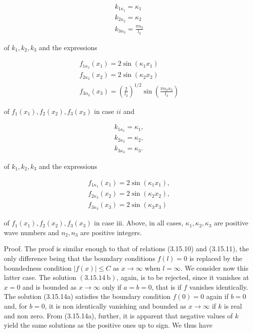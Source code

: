\documentclass{article}
\begin{document}
\begin{align*}
& k_{1 \kappa_{1}}=\kappa_{1}  \tag{3.15.48a}\\
& k_{2 \kappa_{2}}=\kappa_{2}  \tag{3.15.48b}\\
& k_{3 n_{3}}=\frac{\pi n_{3}}{l_{3}} \tag{3.15.48c}
\end{align*}
 
of $k_{1}, k_{2}, k_{3}$ and the expressions
 
\begin{align*}
& f_{1 \kappa_{1}}\left(x_{1}\right)=2 \sin \left(\kappa_{1} x_{1}\right)  \tag{3.15.49a}\\
& f_{2 \kappa_{2}}\left(x_{2}\right)=2 \sin \left(\kappa_{2} x_{2}\right)  \tag{3.15.49b}\\
& f_{3 n_{3}}\left(x_{3}\right)=\left(\frac{2}{l_{3}}\right)^{1 / 2} \sin \left(\frac{\pi n_{3} x_{3}}{l_{3}}\right) \tag{3.15.49c}
\end{align*}
 
of $f_{1}\left(x_{1}\right), f_{2}\left(x_{2}\right), f_{3}\left(x_{3}\right)$ in case $i i$ and
 
\begin{align*}
& k_{1 \kappa_{1}}=\kappa_{1},  \tag{3.15.50a}\\
& k_{2 \kappa_{2}}=\kappa_{2},  \tag{3.15.50b}\\
& k_{3 \kappa_{3}}=\kappa_{3} . \tag{3.15.50c}
\end{align*}
 
of $k_{1}, k_{2}, k_{3}$ and the expressions
 
\begin{align*}
& f_{1 \kappa_{1}}\left(x_{1}\right)=2 \sin \left(\kappa_{1} x_{1}\right),  \tag{3.15.51a}\\
& f_{2 \kappa_{2}}\left(x_{2}\right)=2 \sin \left(\kappa_{2} x_{2}\right),  \tag{3.15.51b}\\
& f_{3 \kappa_{3}}\left(x_{3}\right)=2 \sin \left(\kappa_{3} x_{3}\right) \tag{3.15.51c}
\end{align*}
 
of $f_{1}\left(x_{1}\right), f_{2}\left(x_{2}\right), f_{3}\left(x_{3}\right)$ in case iii. Above, in all cases, $\kappa_{1}, \kappa_{2}, \kappa_{3}$ are positive wave numbers and $n_{2}, n_{3}$ are positive integers.

Proof. The proof is similar enough to that of relations (3.15.10) and (3.15.11), the only difference being that the boundary conditions $f(l)=0$ is replaced by the
boundedness condition $|f(x)| \leq C$ as $x \rightarrow \infty$ when $l=\infty$. We consider now this latter case. The solution $(3.15 .14 \mathrm{~b})$, again, is to be rejected, since it vanishes at $x=0$ and is bounded as $x \rightarrow \infty$ only if $a=b=0$, that is if $f$ vanishes identically. The solution (3.15.14a) satisfies the boundary condition $f(0)=0$ again if $b=0$ and, for $b=0$, it is non identically vanishing and bounded as $x \rightarrow \infty$ if $k$ is real and non zero. From (3.15.14a), further, it is apparent that negative values of $k$ yield the same solutions as the positive ones up to sign. We thus have
 
\end{document}
